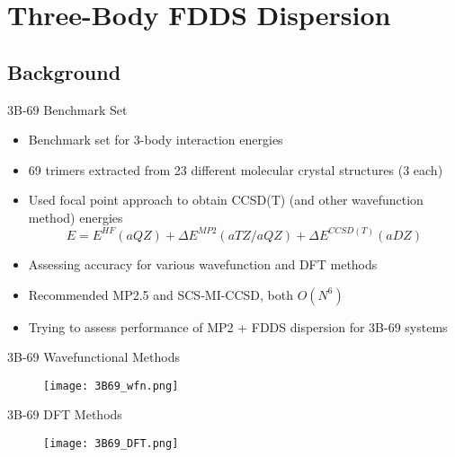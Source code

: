 \documentclass{beamer}
\begin{document}
\section{Three-Body FDDS Dispersion}

    \subsection{Background}
    
        \begin{frame}{3B-69 Benchmark Set}
            \begin{itemize}
                \item Benchmark set for 3-body interaction energies
                \item 69 trimers extracted from 23 different molecular crystal structures (3 each)
                \item Used focal point approach to obtain CCSD(T) (and other wavefunction method) energies
                $$E = E^{HF}(aQZ) + \Delta E^{MP2}(aTZ/aQZ) + \Delta E^{CCSD(T)}(aDZ) $$   
                \item Assessing accuracy for various wavefunction and DFT methods 
                \item Recommended MP2.5 and SCS-MI-CCSD, both $O(N^6)$
                \item Trying to assess performance of MP2 + FDDS dispersion for 3B-69 systems
            \end{itemize}   
        \end{frame}

        \begin{frame}{3B-69 Wavefunctional Methods}
            \begin{figure}
                \centering
                \texttt{[image: 3B69\_wfn.png]}
            \end{figure}
        \end{frame}

        \begin{frame}{3B-69 DFT Methods}
            \begin{figure}
                \centering
                \texttt{[image: 3B69\_DFT.png]}
            \end{figure}
        \end{frame}
\end{document}
